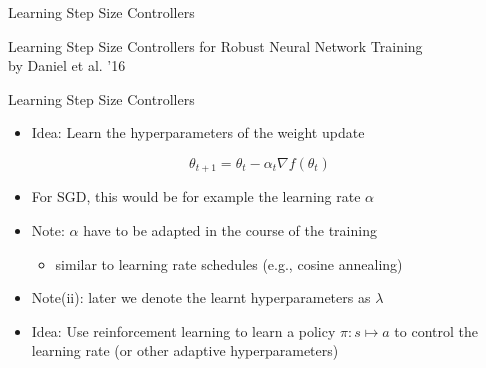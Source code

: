\begin{frame}[c]{Learning Step Size Controllers }

\huge
\centering
Learning Step Size Controllers for Robust Neural Network Training\\
by Daniel et al. '16



\end{frame}
\begin{frame}[c]{Learning Step Size Controllers }

\begin{itemize}
\item \alert{Idea:} Learn the hyperparameters of the weight update 
\end{itemize}

\begin{equation}
\theta_{t+1} = \theta_t - \alpha_t \nabla f(\theta_t) \nonumber
\end{equation}

\begin{itemize}
\pause
\item For SGD, this would be for example the learning rate $\alpha$
\pause
\item \alert{Note}: $\alpha$ have to be adapted in the course of the training
\begin{itemize}
\item similar to learning rate schedules (e.g., cosine annealing)
\end{itemize}
\pause
\item \alert{Note(ii)}: later we denote the learnt hyperparameters as $\lambda$
\medskip
\pause
\item \alert{Idea:} Use reinforcement learning to learn a policy $\pi: s \mapsto a$ to control the learning rate (or other adaptive hyperparameters)
\end{itemize}



\end{frame}
